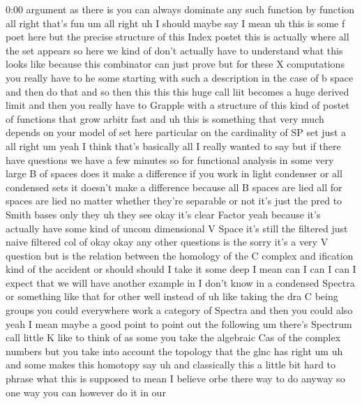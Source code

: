 \begin{unfinished}{0:00}
argument  as  there
is  you  can  always  dominate  any  such
function  by
function  all  right  that's  fun
um  all  right
uh
I  should  maybe  say  I  mean
uh  this  is  some  f  poet  here  but  the
precise  structure  of  this  Index  postet
this  is  actually  where  all  the  set
appears  so  here  we  kind  of  don't
actually  have  to  understand  what  this
looks  like  because  this  combinator  can
just
prove  but  for  these  X  computations  you
really  have  to  he  some  starting  with
such  a  description  in  the  case  of  b
space  and  then  do  that  and  so  then  this
this  this  huge  call  liit  becomes  a  huge
derived  limit  and  then  you  really  have
to  Grapple  with  a  structure  of  this  kind
of  postet
of  functions  that  grow  arbitr  fast  and
uh  this  is  something  that  very  much
depends  on  your  model  of  set  here
particular  on  the  cardinality  of  SP  set
just
a
all  right
um
yeah  I  think  that's  basically  all  I
really  wanted  to  say  but  if  there  have
questions  we  have  a  few
minutes  so  for  functional  analysis  in
some  very  large  B  of  spaces  does  it  make
a  difference  if  you  work  in  light
condenser  or  all  condensed  sets  it
doesn't  make  a  difference  because  all  B
spaces  are  lied  all  for  spaces  are  lied
no  matter  whether  they're  separable  or
not  it's  just  the  pred  to  Smith  bases
only
they  uh  they
see  okay  it's  clear
Factor  yeah  because  it's  actually  have
some  kind  of  uncom  dimensional  V  Space
it's  still  the  filtered  just  naive
filtered  col  of
okay
okay  any  other
questions  is  the  sorry  it's  a  very  V
question  but  is  the  relation  between  the
homology  of  the  C  complex  and
ification  kind  of  the  accident  or  should
should  I  take  it  some
deep  I  mean  can  I  can
I  can  I  expect  that  we  will  have  another
example  in  I  don't  know  in  a  condensed
Spectra  or  something  like  that  for  other
well  instead  of  uh  like  taking  the  dra  C
being  groups  you  could  everywhere  work  a
category  of  Spectra  and  then  you  could
also  yeah  I  mean  maybe  a  good  point  to
point  out  the  following
um  there's  Spectrum  call  little
K  like  to  think  of  as  some  you  take  the
algebraic  Cas  of  the  complex  numbers  but
you  take  into  account  the  topology  that
the  glnc  has
right  um  uh  and  some
makes  this  homotopy  say  uh  and
classically  this  a  little  bit  hard  to
phrase  what  this  is  supposed  to  mean  I
believe  orbe  there  way  to  do  anyway  so
one  way  you  can  however  do  it  in  our

\end{unfinished}
